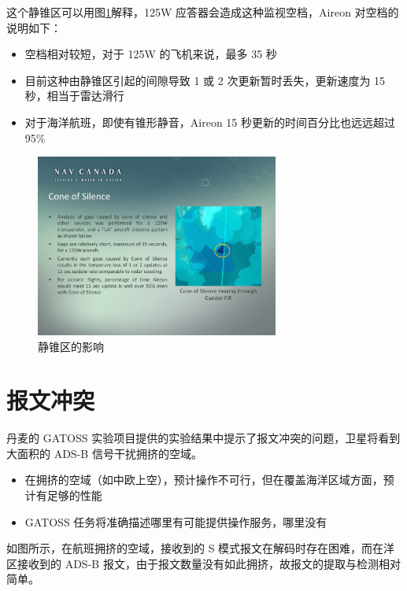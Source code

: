 这个静锥区可以用图\ref{fig:cone_of_silence}解释，125W 应答器会造成这种监视空档，Aireon 对空档的说明如下：

\begin{itemize}
    \item 空档相对较短，对于 125W 的飞机来说，最多 35 秒
    \item 目前这种由静锥区引起的间隙导致 1 或 2 次更新暂时丢失，更新速度为 15 秒，相当于雷达滑行
    \item 对于海洋航班，即使有锥形静音，Aireon 15 秒更新的时间百分比也远远超过 95\%
\end{itemize}

\begin{figure}[!htb]
\centering
\includegraphics[width=8cm]{pic/cone_of_silence.pdf}
\caption{静锥区的影响\protect\footnotemark}
\label{fig:cone_of_silence}
\end{figure}


\section{报文冲突}

丹麦的 GATOSS 实验项目提供的实验结果中提示了报文冲突的问题，卫星将看到大面积的 ADS-B 信号干扰拥挤的空域。

\begin{itemize}
    \item 在拥挤的空域（如中欧上空），预计操作不可行，但在覆盖海洋区域方面，预计有足够的性能

    \item GATOSS 任务将准确描述哪里有可能提供操作服务，哪里没有
\end{itemize}

如图所示，在航班拥挤的空域，接收到的 S 模式报文在解码时存在困难，而在洋区接收到的 ADS-B 报文，由于报文数量没有如此拥挤，故报文的提取与检测相对简单。

